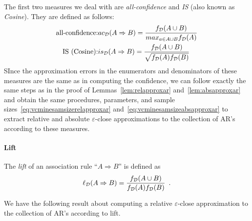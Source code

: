 The first two measures we deal with are \emph{all-confidence} and \emph{IS}
(also known as \emph{Cosine}). They are defined as follows:
\begin{eqnarray*}
  \mbox{all-confidence:} & ac_{\cal D}(A\Rightarrow B)=\frac{f_{\cal D}(A\cup B)}{max_{a\in
  A\cup B}f_{\cal D}(A)}\\
  \mbox{IS (Cosine):} & is_{\cal D}(A\Rightarrow B)=\frac{f_{\cal D}(A\cup
  B)}{\sqrt{f_{\cal D}(A)f_{\cal D}(B)}} 
\end{eqnarray*}
SInce the approximation errors in the enumerators and denominators of these measures are the same as
in computing the confidence, 
we can follow exactly the same
steps as in the proof of Lemmas~\ref{lem:relapproxar} and~\ref{lem:absapproxar} and obtain
 the same procedures, parameters, and sample
sizes~\eqref{eq:vcminesamsizerelapproxar} and~\eqref{eq:vcminesamsizeabsapproxar}  to
extract relative and absolute $\varepsilon$-close approximations to the
collection of AR's according to these measures.

\paragraph{Lift}
The \emph{lift} of an association rule ``$A\Rightarrow B$'' is defined as
\[
\ell_{\cal D}(A\Rightarrow B)=\frac{f_{\cal D}(A\cup B)}{f_{\cal D}(A)f_{\cal D}(B)}\enspace.
\]

We have the following result about computing a relative $\varepsilon$-close
approximation to the collection of AR's according to lift.


